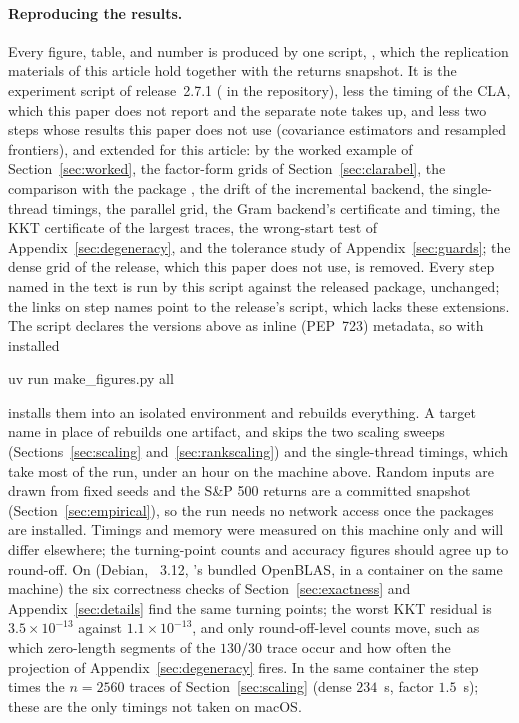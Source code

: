 \paragraph{Reproducing the results.}
Every figure, table, and number is produced by one script, ,
which the replication materials of this article hold together with the returns
snapshot. It is the experiment script of release~2.7.1
( in the  repository), less the timing of the  CLA, which this paper does not
report and the separate note \citep{schmelzer2026comparison} takes up, and less two
steps whose results this paper does not use (covariance estimators and resampled
frontiers), and extended for this article: by the
worked example of Section~\ref{sec:worked}, the factor-form grids of
Section~\ref{sec:clarabel}, the comparison with the  package ,
the drift of the incremental backend, the single-thread timings, the parallel grid, the
Gram backend's certificate and timing, the KKT certificate of the largest traces, the
wrong-start test of Appendix~\ref{sec:degeneracy}, and the tolerance study of
Appendix~\ref{sec:guards}; the dense  grid of the release, which this paper
does not use, is removed. Every step named in the text is run by this script against
the released package, unchanged; the links on step names point to the release's
script, which lacks these extensions. The script declares the versions above as
inline (PEP~723) metadata, so with  installed
\begin{CodeChunk}
\begin{CodeInput}
uv run make_figures.py all
\end{CodeInput}
\end{CodeChunk}
installs them into an isolated environment and rebuilds everything. A target name in
place of  rebuilds one artifact, and  skips the two scaling
sweeps (Sections~\ref{sec:scaling} and~\ref{sec:rankscaling}) and the single-thread timings, which take most of the run, under an hour
on the machine above. Random inputs are drawn from fixed seeds and the S\&P 500 returns
are a committed snapshot (Section~\ref{sec:empirical}), so the run needs no network access
once the packages are installed. Timings and memory were measured on this machine only and will differ elsewhere; the
turning-point counts and accuracy figures should agree up to round-off. On 
(Debian, ~3.12, 's bundled OpenBLAS, in a container on the same
machine) the six correctness checks of Section~\ref{sec:exactness} and
Appendix~\ref{sec:details} find the same turning points; the worst KKT residual is
$3.5\times10^{-13}$ against $1.1\times10^{-13}$, and only round-off-level counts move,
such as which zero-length segments of the $130/30$ trace occur and how often the
projection of Appendix~\ref{sec:degeneracy} fires. In the same container the step
 times the $n=2560$ traces of Section~\ref{sec:scaling} (dense $234$~s,
factor $1.5$~s); these are the only timings not taken on macOS.
